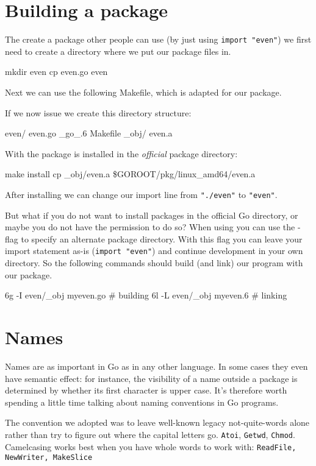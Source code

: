 \section{Building a package}
\label{sec:building a package}
The create a package other people can use (by just using
\lstinline{import "even"}) we first need to create a directory
where we put our package files in. 
\begin{display}
\pr mkdir even
\pr cp even.go even
\end{display}
Next we 
can use the following Makefile, which 
is adapted for our  package.

If we now issue  we create this directory structure:
\begin{display}
even/
    even.go
    \_go\_.6
    Makefile
    \_obj/
	even.a
\end{display}
With  the package is installed in the \emph{official}
package directory:
\begin{display}
\pr make install
cp \_obj/even.a \$GOROOT/pkg/linux\_amd64/even.a
\end{display}
After installing we can change our import line from
\lstinline{"./even"} to \lstinline{"even"}.

But what if you do not want to install packages in the official Go
directory, or maybe you do not have the permission to do so? When using
 you can use the -flag to specify an alternate
package directory. With this flag you can leave your import statement
as-is (\lstinline{import "even"}) and continue development in your
own directory. So the following commands should build (and link) our
 program with our package.
\begin{display}
\pr 6g -I even/\_obj myeven.go	# building
\pr 6l -L even/\_obj myeven.6	# linking
\end{display}

\section{Names}
Names are as important in Go as in any other language. In some cases
they even have semantic effect: for instance, the visibility of a name
outside a package is determined by whether its first character is upper
case. It's therefore worth spending a little time talking about naming
conventions in Go programs.

The convention we adopted was to leave well-known legacy
not-quite-words alone rather than try to figure out where
the capital letters go.  \lstinline{Atoi}, \lstinline{Getwd},
\lstinline{Chmod}.
Camelcasing works best when you have whole words
to work with: \lstinline{ReadFile, NewWriter, MakeSlice}

